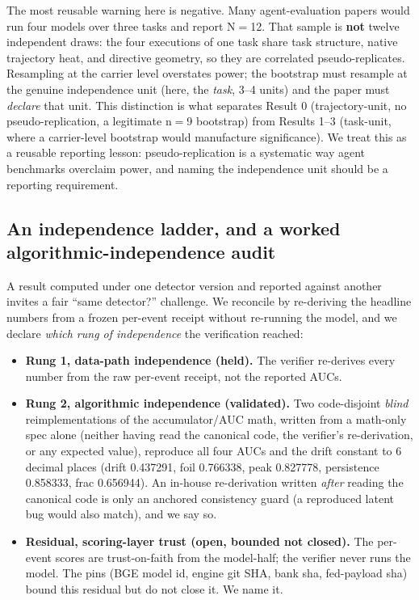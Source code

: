 \documentclass[11pt]{article}
\begin{document}
The most reusable warning here is negative. Many agent-evaluation papers would run four models over
three tasks and report N$=$12. That sample is \textbf{not} twelve independent draws: the four executions of
one task share task structure, native trajectory heat, and directive geometry, so they are
correlated pseudo-replicates. Resampling at the carrier level overstates power; the bootstrap must
resample at the genuine independence unit (here, the \emph{task}, 3--4 units) and the paper must \emph{declare}
that unit. This distinction is what separates Result 0 (trajectory-unit, no pseudo-replication, a
legitimate n$=$9 bootstrap) from Results 1--3 (task-unit, where a carrier-level bootstrap would
manufacture significance). We treat this as a reusable reporting lesson: pseudo-replication is a
systematic way agent benchmarks overclaim power, and naming the independence unit should be a
reporting requirement.

\subsection{An independence ladder, and a worked algorithmic-independence audit}\label{sec:ladder}

A result computed under one detector version and reported against another invites a fair ``same
detector?'' challenge. We reconcile by re-deriving the headline numbers from a frozen per-event
receipt without re-running the model, and we declare \emph{which rung of independence} the verification
reached:

\begin{itemize}
\item \textbf{Rung 1, data-path independence (held).} The verifier re-derives every number from the raw
  per-event receipt, not the reported AUCs.
\item \textbf{Rung 2, algorithmic independence (validated).} Two code-disjoint \emph{blind} reimplementations of
  the accumulator/AUC math, written from a math-only spec alone (neither having read the canonical
  code, the verifier's re-derivation, or any expected value), reproduce all four AUCs and the drift
  constant to 6 decimal places (drift 0.437291, foil 0.766338, peak 0.827778, persistence 0.858333,
  frac 0.656944). An in-house re-derivation written \emph{after} reading the canonical code is only an
  anchored consistency guard (a reproduced latent bug would also match), and we say so.
\item \textbf{Residual, scoring-layer trust (open, bounded not closed).} The per-event scores are
  trust-on-faith from the model-half; the verifier never runs the model. The pins (BGE model id,
  engine git SHA, bank sha, fed-payload sha) bound this residual but do not close it. We name it.
\end{itemize}
\end{document}

